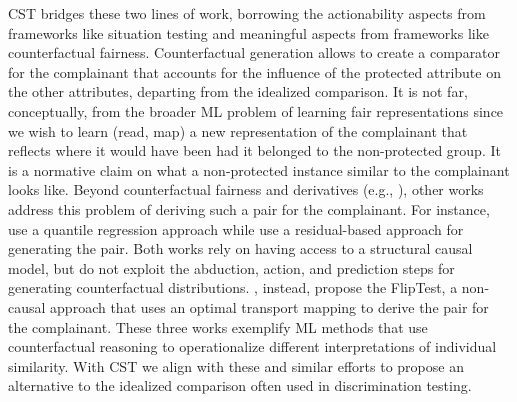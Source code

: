 CST bridges these two lines of work, borrowing the actionability aspects from frameworks like situation testing and meaningful aspects from frameworks like counterfactual fairness. 
Counterfactual generation allows to create a comparator for the complainant that accounts for the influence of the protected attribute on the other attributes, departing from the idealized comparison.
It is not far, conceptually, from the broader ML problem of learning fair representations \parencite{Zemel2013LearningFairRepresentations} since we wish to learn (read, map) a new representation of the complainant that reflects where it would have been had it belonged to the non-protected group. 
It is a normative claim on what a non-protected instance similar to the complainant looks like.
Beyond counterfactual fairness and derivatives (e.g., \textcite{Chiappa2019_PathCF}), other works address this problem of deriving such a pair for the complainant.
For instance, \textcite{Plevcko2020FairDataAdaptation} use a quantile regression approach while \textcite{DBLP:journals/corr/abs-2307-12797} use a residual-based approach for generating the pair.
Both works rely on having access to a structural causal model, but do not exploit the abduction, action, and prediction steps for generating counterfactual distributions.
\textcite{BlackYF20_FlipTest}, instead, propose the FlipTest, a non-causal approach that uses an optimal transport mapping to derive the pair for the complainant.
These three works exemplify ML methods that use counterfactual reasoning to operationalize different interpretations of individual similarity. 
With CST we align with these and similar efforts to propose an alternative to the idealized comparison often used in discrimination testing.

%
%
